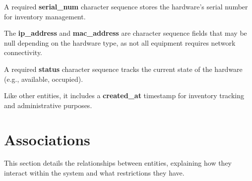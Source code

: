 A required \textbf{serial\_num} character sequence stores the hardware's serial number for inventory management.

The \textbf{ip\_address} and \textbf{mac\_address} are character sequence fields that may be null depending on the hardware type, as not all equipment requires network connectivity.

A required \textbf{status} character sequence tracks the current state of the hardware (e.g., available, occupied).

Like other entities, it includes a \textbf{created\_at} timestamp for inventory tracking and administrative purposes.

\section{Associations}
This section details the relationships between entities, explaining how they interact within the system and what restrictions they have.

